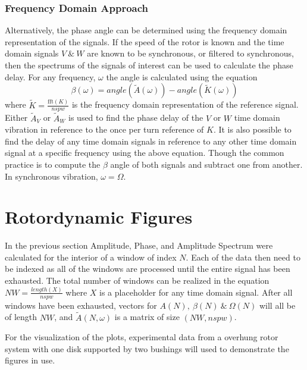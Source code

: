 \subsubsection{Frequency Domain Approach}
Alternatively, the phase angle can be determined using the frequency domain representation of the signals. 
If the speed of the rotor is known and the time domain signals $ V\ \&\ W $ are known to be synchronous, or filtered to synchronous, then the spectrums of the signals of interest can be used to calculate the phase delay. For any frequency, $ \omega $ the angle is calculated using the equation
\begin{equation*}
\beta(\omega)=angle(\tilde{A}(\omega))-angle(\tilde{K}(\omega))
\end{equation*}
where $ \tilde{K} = \frac{\text{fft}(K)}{nspw} $ is the frequency domain representation of the reference signal. Either $ \tilde{A}_V $ or $ \tilde{A}_W $ is used to find the phase delay of the $ V $ or $ W $ time domain vibration in reference to the once per turn reference of $ K $. It is also possible to find the delay of any time domain signals in reference to any other time domain signal at a specific frequency using the above equation. Though the common practice is to compute the $ \beta $ angle of both signals and subtract one from another. In synchronous vibration, $ \omega=\Omega $.\par
\section{Rotordynamic Figures}\label{ExperimentalPlots}
In the previous section Amplitude, Phase, and Amplitude Spectrum were calculated for the interior of a window of index $ N $. Each of the data then need to be indexed as all of the windows are processed until the entire signal has been exhausted. The total number of windows can be realized in the equation $ NW=\frac{length(X)}{nspw} $ where $ X $ is a placeholder for any time domain signal. After all windows have been exhausted, vectors for $ A(N),\ \beta(N)\ \&\ \Omega(N) $ will all be of length $ NW $, and $ \tilde{A}(N,\omega) $ is a matrix of size $ (NW,nspw) $.\par 
For the visualization of the plots, experimental data from a overhung rotor system with one disk supported by two bushings will used to demonstrate the figures in use.\par
